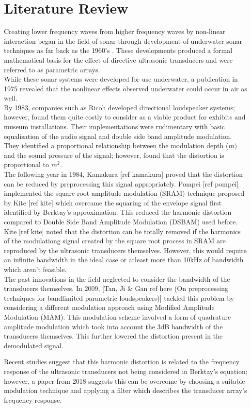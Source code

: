\section{Literature Review}
Creating lower frequency waves from higher frequency waves by non-linear interaction began in the field of sonar through development of underwater sonar techniques as far back as the 1960's \cite{westervelt_1963}. These developments produced a formal mathematical basis for the effect of directive ultrasonic transducers and were referred to as parametric arrays.\\
While these sonar systems were developed for use underwater, a publication in 1975 \cite{bennett_blackstock_1975} revealed that the nonlinear effects observed underwater could occur in air as well.\\
By 1983, companies such as Ricoh \cite{yoneyama_fujimoto_kawamo_sasabe_1983} developed directional loudspeaker systems; however, found them quite costly to consider as a viable product for exhibits and museum installations. Their implementations were rudimentary with basic equalisation of the audio signal and double side band amplitude modulation. They identified a proportional relationship between the modulation depth ($m)$ and the sound pressure of the signal; however, found that the distortion is proportional to $m^2$.\\
The following year in 1984, Kamakura [ref kamakura] proved that the distortion can be reduced by preprocessing this signal appropriately. Pompei [ref pompei] implemented the square root amplitude modulation (SRAM) technique proposed by Kite [ref kite] which overcame the squaring of the envelope signal first identified by Berktay's approximation. This reduced the harmonic distortion compared to Double Side Band Amplitude Modulation (DSBAM) used before.\\
Kite [ref kite] noted that the distortion can be totally removed if the harmonics of the modulationg signal created by the square root process in SRAM are reproduced by the ultrasonic transducers themselves. However, this would require an infinite bandwidth in the ideal case or atleast more than 10kHz of bandwidth which aren't feasible.\\
The past innovations in the field neglected to consider the bandwidth of the transducers themselves. In 2009, [Tan, Ji \& Gan ref here (On preprocessing techniques for bandlimited parametric loudspeakers)] tackled this problem by considering a different modulation approach using Modified Amplitude Modulation (MAM). This modulation scheme involved a form of quadrature amplitude modulation which took into account the 3dB bandwidth of the transducers themselves. This further lowered the distortion present in the demodulated signal.

Recent studies suggest that this harmonic distortion is related to the frequency response of the ultrasonic transducers not being considered in Berktay's equation; however, a paper from 2018 \cite{farias_abdulla_2018} suggests this can be overcome by choosing a suitable modulation technique and applying a filter which describes the transducer array's frequency response.\\
